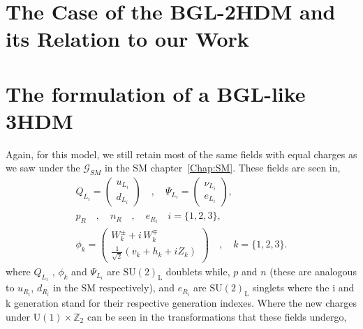 \section{The Case of the BGL-2HDM and its Relation to our Work}


 
\section{The formulation of a BGL-like 3HDM} 

Again, for this model, we still retain most of the same fields with equal charges as we saw under the $\mathcal{G}_{SM}$ in the SM chapter~\ref{Chap:SM}. These fields are seen in, 
%
\begin{equation}
\label{eq:3HDM_Fields}
\begin{gathered}
Q_{L_i} =  \begin{pmatrix}
u_{L_i}  \\
d_{L_i}
\end{pmatrix} \quad , \quad \Psi_{L_i} =  \begin{pmatrix}
\nu_{L_i}  \\
e_{L_i}
\end{pmatrix}  ,  \\ 
p_R \quad , \quad n_R \quad , \quad e_{R_i} \quad i=\{1,2,3\}  ,  \\  
\phi_k = \begin{pmatrix}
W_k^\pm + i \, W_k^\mp \\ 
\frac{1}{\sqrt{2}}\left( v_k + h_k + i Z_k \right) 
\end{pmatrix}  \quad , \quad k=\{ 1,2,3\}  . 
\end{gathered} 
\end{equation}
%
where $Q_{L_i}$ , $\phi_k$ and $\Psi_{L_i}$ are $\mathrm{SU(2)_L}$ doublets while, $p$ and $n$ (these are analogous to $u_{R_i}$, $d_{R_i}$ in the SM respectively), and $e_{R_i}$ are $\mathrm{SU(2)_L}$ singlets where the i and k generation stand for their respective generation indexes. 
%
Where the new charges under $\mathrm{U(1)}\times\mathbb{Z}_2$ can be seen in the transformations that these fields undergo, 
%
